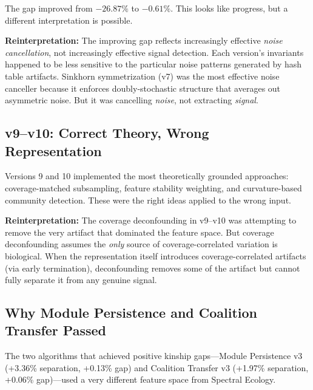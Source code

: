 \documentclass{../yalumba}
\begin{document}
The gap improved from $-26.87\%$ to $-0.61\%$. This looks like progress, but
a different interpretation is possible.

\textbf{Reinterpretation:} The improving gap reflects increasingly effective
\textit{noise cancellation}, not increasingly effective signal detection. Each
version's invariants happened to be less sensitive to the particular noise
patterns generated by hash table artifacts. Sinkhorn symmetrization (v7) was
the most effective noise canceller because it enforces doubly-stochastic
structure that averages out asymmetric noise. But it was cancelling \textit{noise},
not extracting \textit{signal}.

\subsection{v9--v10: Correct Theory, Wrong Representation}

Versions 9 and 10 implemented the most theoretically grounded approaches:
coverage-matched subsampling, feature stability weighting, and curvature-based
community detection. These were the right ideas applied to the wrong input.

\textbf{Reinterpretation:} The coverage deconfounding in v9--v10 was attempting
to remove the very artifact that dominated the feature space. But coverage
deconfounding assumes the \textit{only} source of coverage-correlated variation
is biological. When the representation itself introduces coverage-correlated
artifacts (via early termination), deconfounding removes some of the artifact
but cannot fully separate it from any genuine signal.

\subsection{Why Module Persistence and Coalition Transfer Passed}

The two algorithms that achieved positive kinship gaps---Module Persistence v3
(+3.36\% separation, +0.13\% gap) and Coalition Transfer v3 (+1.97\%
separation, +0.06\% gap)---used a very different feature space from Spectral
Ecology.
\end{document}
